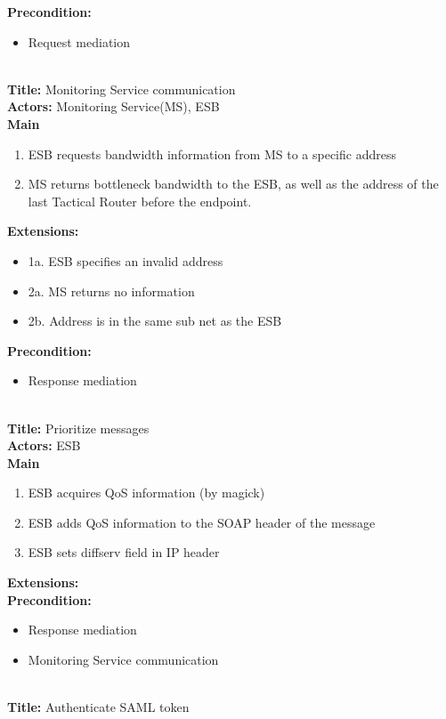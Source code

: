     \textbf{Precondition:}
    \begin{itemize}
        \item Request mediation
    \end{itemize}
    \\
    \textbf{Title:} Monitoring Service communication\\
    \textbf{Actors:} Monitoring Service(MS), ESB\\
    \textbf{Main}
    \begin{enumerate}
        \item ESB requests bandwidth information from MS to a specific address
        \item MS returns bottleneck bandwidth to the ESB, as well as the address of the last Tactical Router before the endpoint.
    \end{enumerate}
    \textbf{Extensions:}
    \begin{itemize}
        \item[]	1a. ESB specifies an invalid address
        \item[]	2a. MS returns no information
        \item[]	2b. Address is in the same sub net as the ESB
    \end{itemize}
    \textbf{Precondition:}
    \begin{itemize}
        \item Response mediation
    \end{itemize}
    \\
    \textbf{Title:} Prioritize messages\\
    \textbf{Actors:} ESB\\
    \textbf{Main}
    \begin{enumerate}
        \item ESB acquires QoS information (by magick)
        \item ESB adds QoS information to the SOAP header of the message
        \item ESB sets diffserv field in IP header
    \end{enumerate}
    \textbf{Extensions:}\\
    \textbf{Precondition:}
    \begin{itemize}
        \item Response mediation
        \item Monitoring Service communication
    \end{itemize}
    \\
    \textbf{Title:} Authenticate SAML token\\
